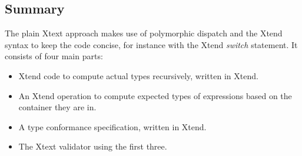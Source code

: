 

\subsection{Summary}
The plain Xtext approach makes use of polymorphic dispatch and the Xtend syntax to keep the code concise, for instance with the Xtend \emph{switch} statement. It consists of four main parts:
\begin{itemize}
\item Xtend code to compute actual types recursively, written in Xtend.
\item An Xtend operation to compute expected types of expressions based on the container they are in.
\item A type conformance specification, written in Xtend.
\item The Xtext validator using the first three.
\end{itemize}

